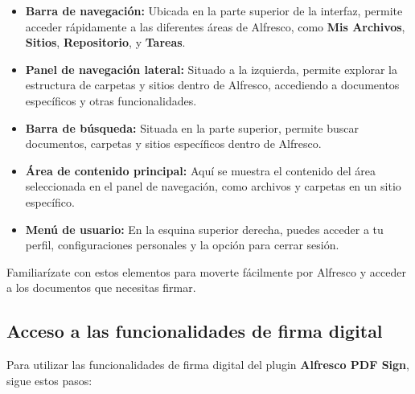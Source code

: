 \documentclass{template/ol-softwaremanual}
\begin{document}
\begin{itemize}
	\item \textbf{Barra de navegación:} Ubicada en la parte superior de la interfaz, permite acceder rápidamente a las diferentes áreas de Alfresco, como \textbf{Mis Archivos}, \textbf{Sitios}, \textbf{Repositorio}, y \textbf{Tareas}.
	\item \textbf{Panel de navegación lateral:} Situado a la izquierda, permite explorar la estructura de carpetas y sitios dentro de Alfresco, accediendo a documentos específicos y otras funcionalidades.
	\item \textbf{Barra de búsqueda:} Situada en la parte superior, permite buscar documentos, carpetas y sitios específicos dentro de Alfresco.
	\item \textbf{Área de contenido principal:} Aquí se muestra el contenido del área seleccionada en el panel de navegación, como archivos y carpetas en un sitio específico.
	\item \textbf{Menú de usuario:} En la esquina superior derecha, puedes acceder a tu perfil, configuraciones personales y la opción para cerrar sesión.
\end{itemize}

Familiarízate con estos elementos para moverte fácilmente por Alfresco y acceder a los documentos que necesitas firmar.

\subsection{Acceso a las funcionalidades de firma digital}
Para utilizar las funcionalidades de firma digital del plugin \textbf{Alfresco PDF Sign}, sigue estos pasos:
\end{document}
